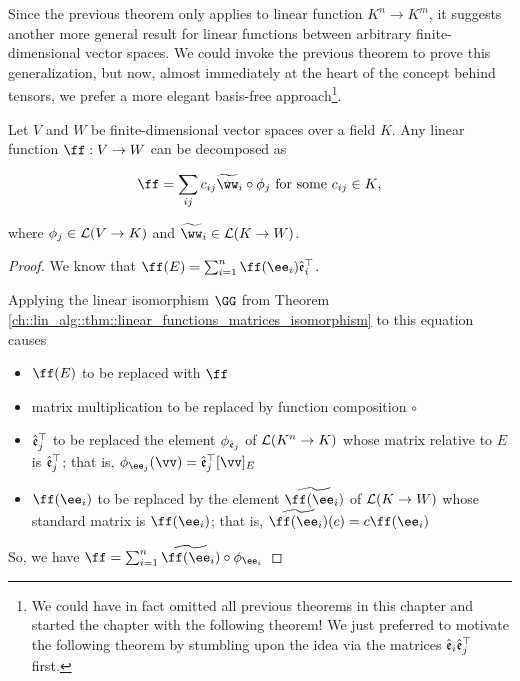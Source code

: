 Since the previous theorem only applies to linear function $K^n \rightarrow K^m$, it suggests another more general result for linear functions between arbitrary finite-dimensional vector spaces. We could invoke the previous theorem to prove this generalization, but now, almost immediately at the heart of the concept behind tensors, we prefer a more elegant basis-free approach\footnote{We could have in fact omitted all previous theorems in this chapter and started the chapter with the following theorem! We just preferred to motivate the following theorem by stumbling upon the idea via the matrices $\hat{\mathfrak{e}}_i \hat{\mathfrak{e}}_j^\top$ first.}.



\begin{theorem}
    Let $V$ and $W$ be finite-dimensional vector spaces over a field $K$. Any linear function $\ff:V \rightarrow W$ can be decomposed as

    \begin{align*}
        \ff = \sum_{ij} c_{ij} \tww_i \circ \phi_j \text{ for some $c_{ij} \in K$},
    \end{align*}

    where $\phi_j \in \mathcal{L}(V \rightarrow K)$ and $\tww_i \in \LLLL(K \rightarrow W)$.
\end{theorem}

\begin{proof}
    We know that $\ff(E) = \sum_{i = 1}^n \ff(\ee_i) \see_i^\top$.

    Applying the linear isomorphism $\GG$ from Theorem \ref{ch::lin_alg::thm::linear_functions_matrices_isomorphism} to this equation causes

    \begin{itemize}
        \item $\ff(E)$ to be replaced with $\ff$
        \item matrix multiplication to be replaced by function composition $\circ$
        \item $\hat{\mathfrak{e}}_j^\top$ to be replaced the element $\phi_{\hat{\mathfrak{e}}_j}$ of $\mathcal{L}(K^n \rightarrow K)$ whose matrix relative to $E$ is $\hat{\mathfrak{e}}_j^\top$; that is, $\phi_{\ee_j}(\vv) = \see_j^\top [\vv]_E$
        \item $\ff(\ee_i)$ to be replaced by the element $\widetilde{\ff(\ee_i)}$ of $\mathcal{L}(K \rightarrow W)$ whose standard matrix is $\ff(\ee_i)$; that is, $\widetilde{\ff(\ee_i)}(c) = c\ff(\ee_i)$
    \end{itemize}

    So, we have $\ff = \sum_{i = 1}^n \widetilde{\ff(\ee_i)} \circ \phi_{\ee_i}$

    
\end{proof}


